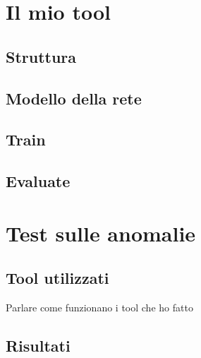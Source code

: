 \section{Il mio tool}
\subsection{Struttura}
\subsection{Modello della rete}
\subsection{Train}
\subsection{Evaluate}


\section{Test sulle anomalie}
\subsection{Tool utilizzati}

Parlare come funzionano i tool che ho fatto

\subsection{Risultati}
